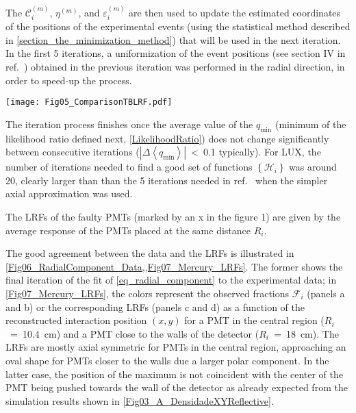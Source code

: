 \documentclass[a4paper,11pt]{article}
\begin{document}
The $\mathcal{C}_i^{(m)}$, $\eta^{(m)}$, and $\varepsilon_i^{(m)}$ are then used to update the estimated coordinates of the positions of the experimental events (using the statistical method described in  \cref{section_the_minimization_method}) that will be used in the next iteration. In the first 5 iterations, a uniformization of the event positions (see section IV in ref.\ \cite{hertel2015}) obtained in the previous iteration was performed in the radial direction, in order to speed-up the process. 


\begin{figure*}
 \begin{center}  
\texttt{[image: Fig05\_ComparisonTBLRF.pdf]}
\caption{2D histogram of the fractions ${\mathcal F}_i$ from ${}^{{\rm 83m}}$Kr for
$R_i$~=~10.4~cm (panel a) and $R_i$~=~18~cm (panel b)  events and the respective LRFs (panel c and d). The contours of the photomultipliers and the border of the chamber are shown in gray, while the center of the PMT under analysis is marked by a black cross.}
  \label{Fig07_Mercury_LRFs}
 \end{center}
\end{figure*}


The iteration process finishes once the average value of the $q_{\mathrm{min}}$ (minimum of the likelihood ratio defined next, \cref{LikelihoodRatio}) does not change significantly between consecutive iterations ($\left|\Delta \left<q_{\mathrm{min}}\right>\right|$~<~0.1 typically). For LUX, the number of iterations needed to find a good set of functions $\left\{\mathcal{H}_i\right\}$ was around 20, clearly larger than than the 5 iterations needed in ref.\ \cite{Solovov2011_PositionReconstruction} when the simpler axial approximation was used.

The LRFs of the faulty PMTs (marked by an x in the figure 1) are given by the average response of the PMTs placed at the same distance $R_i$.

The good agreement between the data and the LRFs { is illustrated in \cref{Fig06_RadialComponent_Data,,Fig07_Mercury_LRFs}}. The former shows the final iteration of the fit of \cref{eq_radial_component} to the experimental data; in \cref{Fig07_Mercury_LRFs}, the colors represent the observed  fractions $\mathcal{F}_i$ (panels a and b) or the corresponding LRFs (panels c and d) as a function of the reconstructed interaction position $(x, y)$ for a PMT in the central region ($R_i$~=~10.4~cm) and a PMT close to the walls of the detector ($R_i$~=~18~cm). The LRFs are mostly axial symmetric for  PMTs in the central region, approaching an oval shape for PMTs closer to the walls due a larger polar component. In the latter case, the position of the maximum is not coincident with the center of the PMT being pushed towards the wall of the detector as already expected from the simulation results shown in \cref{Fig03_A_DensidadeXYReflective}. 
\end{document}
